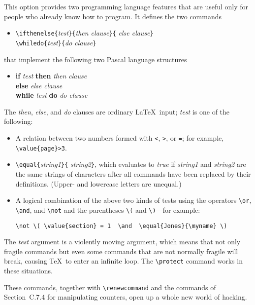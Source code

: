 This option provides two programming language features that are useful
only for people who already know how to program.  It defines the
two commands
\begin{itemize} 
\item[]
\verb|\ifthenelse{|{\em test\/}\verb|}{|{\em then clause\/}\verb|}{|%
{\em else clause\/}\verb|}|\\
\verb|\whiledo{|{\em test\/}\verb|}{|{\em do clause\/}\verb|}|
\end{itemize}
that implement the following two Pascal language structures
\begin{itemize}
\item[]
\begin{tabbing}
{\bf if} {\em test\/} \= {\bf then} \= {\em then clause\/} \\
 \> {\bf else} \> {\em else clause\/} \\[2pt]
{\bf while} {\em test\/} {\bf do} {\em do clause\/}
\end{tabbing}
\end{itemize}
The {\em then\/}, {\em else\/}, and {\em do\/} clauses
are ordinary \LaTeX\ input; {\em test\/} is one of the following:
\begin{itemize}
 \item A relation between two numbers formed with {\tt <}, {\tt >},
or {\tt =}; for example, \hbox{\verb|\value{page}>3|}.
 \item \verb|\equal{|{\em string1\/}\verb|}{|%
{\em string2\/}\verb|}|, which evaluates to {\em true\/} if {\em
string1\/} and {\em string2\/} are the same strings of characters after
all commands have been replaced by their definitions.  (Upper- and
lowercase letters are unequal.)
 \item A logical combination of the above two kinds of tests
    using the operators \hbox{\verb|\or|}, \hbox{\verb|\and|},
    and \hbox{\verb|\not|} and the parentheses \hbox{\verb|\(|}
    and \hbox{\verb|\)|}---for example:
\begin{verbatim}
\not \( \value{section} = 1  \and  \equal{Jones}{\myname} \)
\end{verbatim}
\end{itemize}
The {\em test\/} argument is a violently moving argument, which means
that not only fragile commands but even some commands that are not
normally fragile will break, causing \TeX\ to enter an infinite loop.
The \verb|\protect| command works in these situations.
 
These commands, together with \hbox{\verb|\renewcommand|} and the
commands of Section~C.7.4 for manipulating counters, open up a whole
new world of hacking.
 
